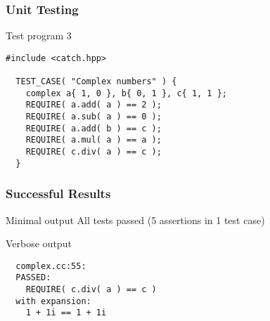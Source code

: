 \begin{frame}[fragile]
  \frametitle{Unit Testing}
  \begin{block}{Test program 3}
    \begin{lstlisting}[style=C]
  #include <catch.hpp>

  TEST_CASE( "Complex numbers" ) {
    complex a{ 1, 0 }, b{ 0, 1 }, c{ 1, 1 };
    REQUIRE( a.add( a ) == 2 );
    REQUIRE( a.sub( a ) == 0 );
    REQUIRE( a.add( b ) == c );
    REQUIRE( a.mul( a ) == a );
    REQUIRE( c.div( a ) == c );
  }
    \end{lstlisting}
  \end{block}
\end{frame}

\begin{frame}[fragile]
  \frametitle{Successful Results}
  \begin{block}{Minimal output}
    All tests passed (5 assertions in 1 test case)
  \end{block}
  \begin{block}{Verbose output}
    \begin{verbatim}
  complex.cc:55: 
  PASSED:
    REQUIRE( c.div( a ) == c )
  with expansion:
    1 + 1i == 1 + 1i
    \end{verbatim}
  \end{block}
\end{frame}

